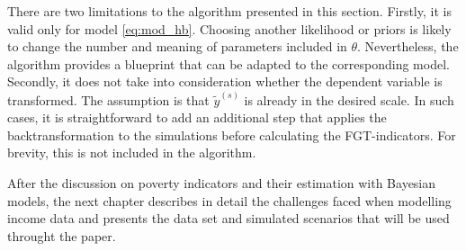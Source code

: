 There are two limitations to the algorithm presented in this section.
Firstly, it is valid only for model \ref{eq:mod_hb}.
Choosing another likelihood or priors is likely to change the number and meaning of parameters included in $\theta$.
Nevertheless, the algorithm provides a blueprint that can be adapted to the corresponding model.
Secondly, it does not take into consideration whether the dependent variable is transformed.
The assumption is that $\tilde y^{(s)}$ is already in the desired scale.
In such cases, it is straightforward to add an additional step that applies the backtransformation to the simulations before calculating the FGT-indicators.
For brevity, this is not included in the algorithm.

After the discussion on poverty indicators and their estimation with Bayesian models, the next chapter describes in detail the challenges faced when modelling income data and presents the data set and simulated scenarios that will be used throught the paper.